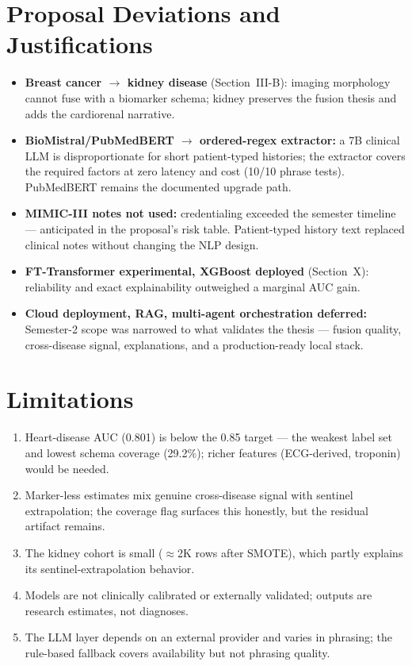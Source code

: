 \documentclass[journal]{IEEEtran}
\begin{document}
\section{Proposal Deviations and Justifications}
\begin{itemize}
    \item \textbf{Breast cancer $\to$ kidney disease} (Section~III-B): imaging morphology cannot fuse with a biomarker schema; kidney preserves the fusion thesis and adds the cardiorenal narrative.
    \item \textbf{BioMistral/PubMedBERT $\to$ ordered-regex extractor:} a 7B clinical LLM is disproportionate for short patient-typed histories; the extractor covers the required factors at zero latency and cost (10/10 phrase tests). PubMedBERT remains the documented upgrade path.
    \item \textbf{MIMIC-III notes not used:} credentialing exceeded the semester timeline --- anticipated in the proposal's risk table. Patient-typed history text replaced clinical notes without changing the NLP design.
    \item \textbf{FT-Transformer experimental, XGBoost deployed} (Section~X): reliability and exact explainability outweighed a marginal AUC gain.
    \item \textbf{Cloud deployment, RAG, multi-agent orchestration deferred:} Semester-2 scope was narrowed to what validates the thesis --- fusion quality, cross-disease signal, explanations, and a production-ready local stack.
\end{itemize}

\section{Limitations}
\begin{enumerate}
    \item Heart-disease AUC (0.801) is below the 0.85 target --- the weakest label set and lowest schema coverage (29.2\%); richer features (ECG-derived, troponin) would be needed.
    \item Marker-less estimates mix genuine cross-disease signal with sentinel extrapolation; the coverage flag surfaces this honestly, but the residual artifact remains.
    \item The kidney cohort is small ($\approx$2K rows after SMOTE), which partly explains its sentinel-extrapolation behavior.
    \item Models are not clinically calibrated or externally validated; outputs are research estimates, not diagnoses.
    \item The LLM layer depends on an external provider and varies in phrasing; the rule-based fallback covers availability but not phrasing quality.
\end{enumerate}
\end{document}
